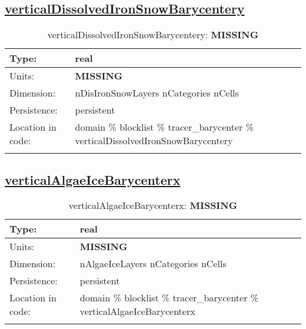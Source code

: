 \subsection[verticalDissolvedIronSnowBarycentery]{\hyperref[sec:var_tab_tracer_barycenter]{verticalDissolvedIronSnowBarycentery}}
\label{subsec:var_sec_tracer_barycenter_verticalDissolvedIronSnowBarycentery}
\begin{center}
\begin{longtable}{| p{2.0in} | p{4.0in} |}
        \hline 
        Type: & real \\
        \hline 
        Units: & {\bf \color{red} MISSING} \\
        \hline 
        Dimension: & nDisIronSnowLayers nCategories nCells \\
        \hline 
        Persistence: & persistent \\
        \hline 
         Location in code: & domain \% blocklist \% tracer\_barycenter \% verticalDissolvedIronSnowBarycentery \\
         \hline 
    \caption{verticalDissolvedIronSnowBarycentery: {\bf \color{red} MISSING}}
\end{longtable}
\end{center}
\subsection[verticalAlgaeIceBarycenterx]{\hyperref[sec:var_tab_tracer_barycenter]{verticalAlgaeIceBarycenterx}}
\label{subsec:var_sec_tracer_barycenter_verticalAlgaeIceBarycenterx}
\begin{center}
\begin{longtable}{| p{2.0in} | p{4.0in} |}
        \hline 
        Type: & real \\
        \hline 
        Units: & {\bf \color{red} MISSING} \\
        \hline 
        Dimension: & nAlgaeIceLayers nCategories nCells \\
        \hline 
        Persistence: & persistent \\
        \hline 
         Location in code: & domain \% blocklist \% tracer\_barycenter \% verticalAlgaeIceBarycenterx \\
         \hline 
    \caption{verticalAlgaeIceBarycenterx: {\bf \color{red} MISSING}}
\end{longtable}
\end{center}
